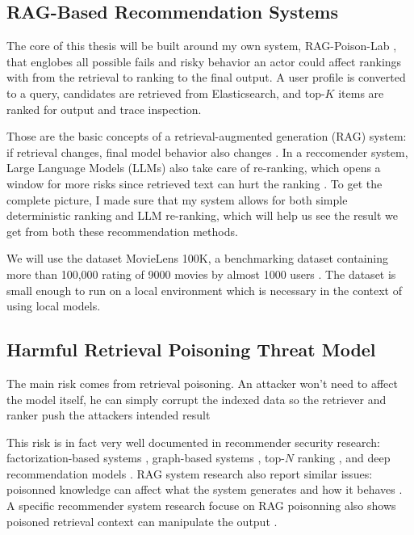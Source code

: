 \subsection{RAG-Based Recommendation Systems}

The core of this thesis will be built around my own system, RAG-Poison-Lab \cite{ragpoisonlab_repo}, that englobes all possible fails and risky behavior an actor could affect rankings with from the retrieval to ranking to the final output. A user profile is converted to a query, candidates are retrieved from Elasticsearch, and top-$K$ items are ranked for output and trace inspection.

Those are the basic concepts of a retrieval-augmented generation (RAG) system: if retrieval changes, final model behavior also changes \cite{lewis2020rag}. In a reccomender system, Large Language Models (LLMs) also take care of re-ranking, which opens a window for more risks since retrieved text can hurt the ranking \cite{hou2023llmrankers}. To get the complete picture, I made sure that my system allows for both simple deterministic ranking and LLM re-ranking, which will help us see the result we get from both these recommendation methods.

We will use the dataset MovieLens 100K, a benchmarking dataset containing more than 100,000 rating of 9000 movies by almost 1000 users \cite{harper2015movielens}. The dataset is small enough to run on a local environment which is necessary in the context of using local models.

\subsection{Harmful Retrieval Poisoning Threat Model}

The main risk comes from retrieval poisoning. An attacker won't need to affect the model itself, he can simply corrupt the indexed data so the retriever and ranker push the attackers intended result

This risk is in fact very well documented in recommender security research: factorization-based systems \cite{li2016factorizationpoison}, graph-based systems \cite{fang2018graphpoison}, top-$N$ ranking \cite{fang2020influencepoison}, and deep recommendation models \cite{huang2021deeppoison}. RAG system research also report similar issues: poisonned knowledge can affect what the system generates and how it behaves \cite{zou2024poisonedrag,zhang2025corruptrag}. A specific recommender system research focuse on RAG poisonning also shows poisoned retrieval context can manipulate the output \cite{nazary2025poisonrag}.


